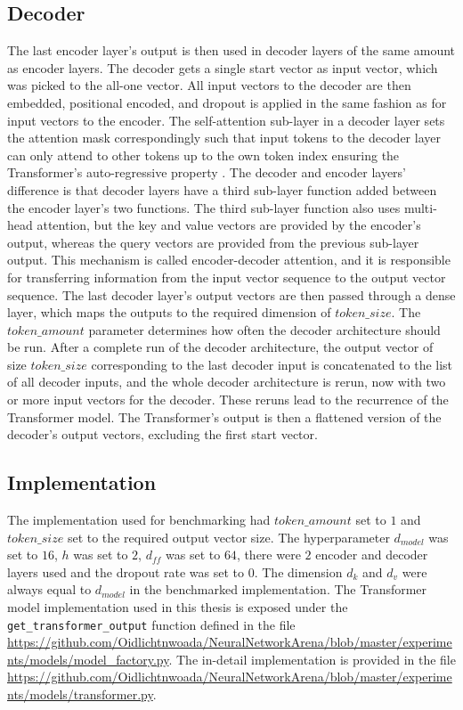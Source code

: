 \documentclass[draft,final]{vutinfth} %
\begin{document}
    \subsection{Decoder} \label{transformer_decoder}
    The last encoder layer's output is then used in decoder layers of the same amount as encoder layers.
    The decoder gets a single start vector as input vector, which was picked to the all-one vector.
    All input vectors to the decoder are then embedded, positional encoded, and dropout is applied in the same fashion as for input vectors to the encoder.
    The self-attention sub-layer in a decoder layer sets the attention mask correspondingly such that input tokens to the decoder layer can only attend to other tokens up to the own token index ensuring the Transformer's auto-regressive property \cite[p. 5]{Transformer}.
    The decoder and encoder layers' difference is that decoder layers have a third sub-layer function added between the encoder layer's two functions.
    The third sub-layer function also uses multi-head attention, but the key and value vectors are provided by the encoder's output, whereas the query vectors are provided from the previous sub-layer output.
    This mechanism is called encoder-decoder attention, and it is responsible for transferring information from the input vector sequence to the output vector sequence.
    The last decoder layer's output vectors are then passed through a dense layer, which maps the outputs to the required dimension of $token\_size$.
    The $token\_amount$ parameter determines how often the decoder architecture should be run.
    After a complete run of the decoder architecture, the output vector of size $token\_size$ corresponding to the last decoder input is concatenated to the list of all decoder inputs, and the whole decoder architecture is rerun, now with two or more input vectors for the decoder.
    These reruns lead to the recurrence of the Transformer model.
    The Transformer's output is then a flattened version of the decoder's output vectors, excluding the first start vector.

    \subsection{Implementation} \label{transformer_implementation}
    The implementation used for benchmarking had $token\_amount$ set to $1$ and $token\_size$ set to the required output vector size.
    The hyperparameter $d_{model}$ was set to $16$, $h$ was set to $2$, $d_{ff}$ was set to $64$, there were $2$ encoder and decoder layers used and the dropout rate was set to $0$.
    The dimension $d_k$ and $d_v$ were always equal to $d_{model}$ in the benchmarked implementation.
    The Transformer model implementation used in this thesis is exposed under the \texttt{get\_transformer\_output} function defined in the file \url{https://github.com/Oidlichtnwoada/NeuralNetworkArena/blob/master/experiments/models/model_factory.py}.
    The in-detail implementation is provided in the file \url{https://github.com/Oidlichtnwoada/NeuralNetworkArena/blob/master/experiments/models/transformer.py}.
\end{document}
